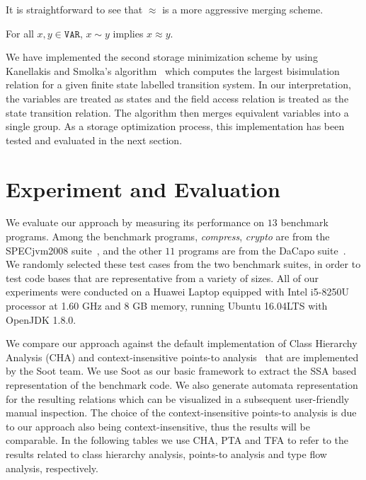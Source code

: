 \documentclass{llncs}
\newcommand\Var{\mathtt{VAR}}
\begin{document}
It is straightforward to see that $\approx$ is a more aggressive merging scheme.
\begin{lemma}\label{lem:bisimilar}
For all $x,y\in\Var$, $x\sim y$ implies $x\approx y$.
\end{lemma}


We have implemented the second storage minimization scheme by using Kanellakis and Smolka's algorithm~\cite{Kanellakis90} which computes the largest bisimulation relation for a given finite state labelled transition system. In our interpretation, the variables are treated as states and the field access relation is treated as the state transition relation. The algorithm then merges equivalent variables into a single group. As a storage optimization process, this implementation has been tested and evaluated in the next section.


\section{Experiment and Evaluation}\label{sec:experiment}

We evaluate our approach by measuring its performance on $13$ benchmark programs. Among the benchmark programs, \textit{compress}, \textit{crypto} are from the SPECjvm2008 suite~\cite{specjvm}, and the other $11$ programs are from the DaCapo suite~\cite{Blackburn2006}. We randomly selected these test cases from the two benchmark suites, in order to test code bases that are representative from a variety of sizes.
All of our experiments were conducted on a Huawei Laptop equipped with Intel i5-8250U processor at 1.60 GHz and 8 GB memory, running Ubuntu 16.04LTS with OpenJDK 1.8.0.

We compare our approach against the default implementation of Class Hierarchy Analysis (CHA) and context-insensitive points-to analysis~\cite{Lhotak2003} that are implemented by the Soot team. We use Soot as our basic framework to extract the SSA based representation of the benchmark code. We also generate automata representation for the resulting relations which can be visualized in a subsequent user-friendly manual inspection. The choice of the context-insensitive points-to analysis is due to our approach also being context-insensitive, thus the results will be comparable. In the following tables we use CHA, PTA and TFA to refer to the results related to class hierarchy analysis, points-to analysis and type flow analysis, respectively.
\end{document}
